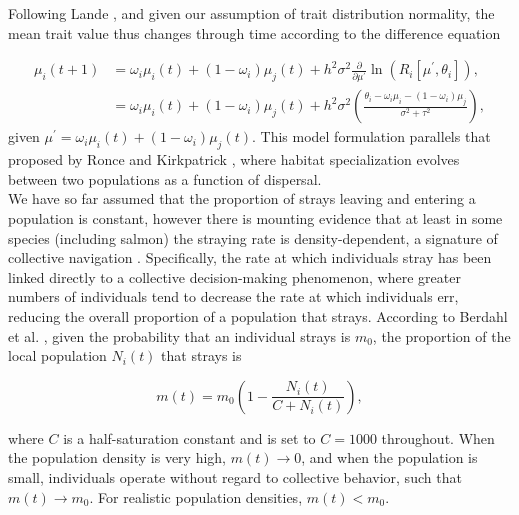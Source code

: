 \documentclass{revtex4}
\begin{document}
Following Lande \citep{Lande:1976ga}, and given our assumption of trait distribution normality, the mean trait value thus changes through time according to the difference equation

\begin{align}
  \label{eq:mu}
  \mu_i(t+1) &= \omega_i\mu_i(t) + (1-\omega_i)\mu_j(t) + h^2\sigma^2\frac{\partial}{\partial \mu^\prime}\ln\left(R_i[\mu^\prime,\theta_i] \right), \\ \nonumber
  &= \omega_i\mu_i(t) + (1-\omega_i)\mu_j(t) + h^2\sigma^2\left(\frac{\theta_i - \omega_i\mu_i - (1-\omega_i)\mu_j}{\sigma^2+\tau^2} \right),
\end{align}
given $\mu^\prime = \omega_i \mu_i(t)+ (1-\omega_i)\mu_j(t)$.
This model formulation parallels that proposed by Ronce and Kirkpatrick \citep{Ronce:2001dp}, where habitat specialization evolves between two populations as a function of dispersal.
\\

\noindent We have so far assumed that the proportion of strays leaving and entering a population is constant, however there is mounting evidence that at least in some species (including salmon) the straying rate is density-dependent, a signature of collective navigation \citep{Berdahl:2014bl,Berdahl:2017uu}.
Specifically, the rate at which individuals stray has been linked directly to a collective decision-making phenomenon, where greater numbers of individuals tend to decrease the rate at which individuals err, reducing the overall proportion of a population that strays.
According to Berdahl et al. \citep{Berdahl:2016dx}, given the probability that an individual strays is $m_0$, the proportion of the local population $N_i(t)$ that strays is

\begin{equation}
  m(t) = m_0\left(1- \frac{N_i(t)}{C+N_i(t)}\right),
  \label{eq:ddm}
\end{equation}

\noindent where $C$ is a half-saturation constant and is set to $C=1000$ throughout.
When the population density is very high, $m(t) \rightarrow 0$, and when the population is small, individuals operate without regard to collective behavior, such that $m(t) \rightarrow m_0$.
For realistic population densities, $m(t) < m_0$.\\
\end{document}

